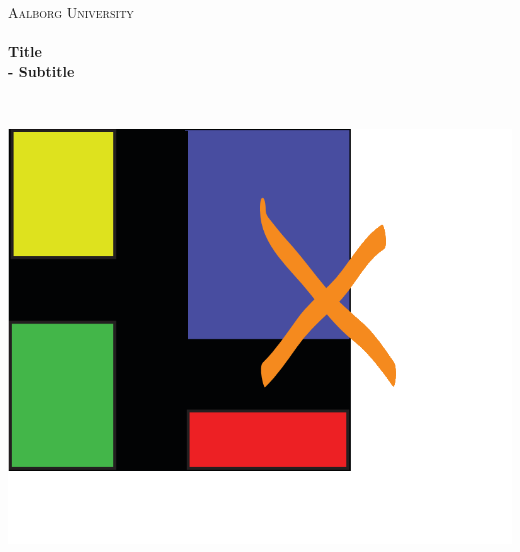 \begin{titlingpage}\centering

\textsc{\LARGE Aalborg University}\\[0.3cm]

\HRule \\[0.4cm]
{\huge \bfseries Title}\\[0.5cm]
{\Large \bfseries - Subtitle}

\HRule \\[2cm]

\begin{minipage}{\columnwidth}
\hspace*{2.5cm}\includegraphics[width=0.85\linewidth]{img/icon_big.png}
\end{minipage}


\end{titlingpage}
